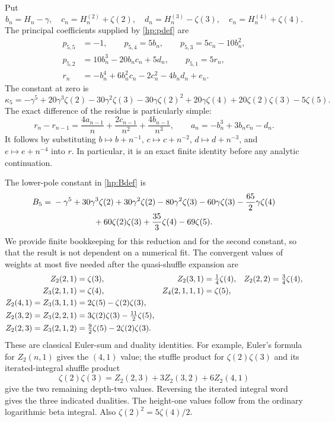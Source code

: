Put
\[
 b_n=H_n-\gamma,\quad c_n=H_n^{(2)}+\zeta(2),\quad
 d_n=H_n^{(3)}-\zeta(3),\quad e_n=H_n^{(4)}+\zeta(4).
\]
The principal coefficients supplied by \eqref{hp:pdef} are
\begin{equation}\label{hp:fifthparts}
 \begin{aligned}
 p_{5,5}&=-1,\qquad p_{5,4}=5b_n,\qquad p_{5,3}=5c_n-10b_n^2,\\
 p_{5,2}&=10b_n^3-20b_nc_n+5d_n,\qquad p_{5,1}=5r_n,\\
 r_n&=-b_n^4+6b_n^2c_n-2c_n^2-4b_nd_n+e_n.
 \end{aligned}
\end{equation}
The constant at zero is
\begin{equation}\label{hp:kappa5}
 \kappa_5=-\gamma^5+20\gamma^3\zeta(2)-30\gamma^2\zeta(3)
 -30\gamma\zeta(2)^2+20\gamma\zeta(4)
 +20\zeta(2)\zeta(3)-5\zeta(5).
\end{equation}
The exact difference of the residue is particularly simple:
\begin{equation}\label{hp:resdiff}
 r_n-r_{n-1}=\frac{4a_{n-1}}n+\frac{2c_{n-1}}{n^2}
                         +\frac{4b_{n-1}}{n^3},
 \qquad a_n=-b_n^3+3b_nc_n-d_n.
\end{equation}
It follows by substituting $b\mapsto b+n^{-1}$,
$c\mapsto c+n^{-2}$, $d\mapsto d+n^{-3}$, and
$e\mapsto e+n^{-4}$ into $r$. In particular, it is an exact finite
identity before any analytic continuation.

The lower-pole constant in \eqref{hp:Bdef} is
\begin{align}\label{hp:B5}
 B_5={}&-\gamma^5+30\gamma^3\zeta(2)+30\gamma^2\zeta(2)
      -80\gamma^2\zeta(3)-60\gamma\zeta(3)
      -\frac{65}{2}\gamma\zeta(4)\notag\\
 &\hspace{17mm}+60\zeta(2)\zeta(3)+\frac{35}{3}\zeta(4)-69\zeta(5).
\end{align}
We provide finite bookkeeping for this reduction and for the second
constant, so that the result is not dependent on a numerical fit.
The convergent values of weights at most five needed after the
quasi-shuffle expansion are
\begin{align}\label{hp:MZVtable}
 Z_2(2,1)&=\zeta(3),&Z_2(3,1)&=\tfrac14\zeta(4),&
 Z_2(2,2)&=\tfrac34\zeta(4),\notag\\
 Z_3(2,1,1)&=\zeta(4),&Z_4(2,1,1,1)&=\zeta(5),\notag\\
 Z_2(4,1)=Z_3(3,1,1)&=2\zeta(5)-\zeta(2)\zeta(3),\notag\\
 Z_2(3,2)=Z_3(2,2,1)&=3\zeta(2)\zeta(3)-\tfrac{11}{2}\zeta(5),\notag\\
 Z_2(2,3)=Z_3(2,1,2)&=\tfrac92\zeta(5)-2\zeta(2)\zeta(3).
\end{align}
These are classical Euler-sum and duality identities. For example,
Euler's formula for $Z_2(n,1)$ gives the $(4,1)$ value; the stuffle
product for $\zeta(2)\zeta(3)$ and its iterated-integral shuffle
product
\[
 \zeta(2)\zeta(3)=Z_2(2,3)+3Z_2(3,2)+6Z_2(4,1)
\]
give the two remaining depth-two values. Reversing the iterated
integral word gives the three indicated dualities. The height-one
values follow from the ordinary logarithmic beta integral. Also
$\zeta(2)^2=5\zeta(4)/2$.

